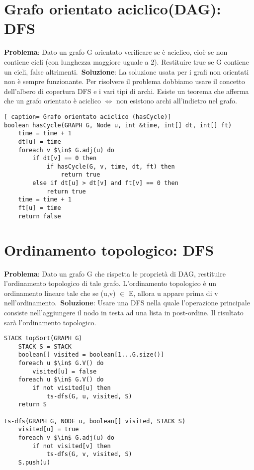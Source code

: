 \documentclass[../cheatSheetAlgoritmi.tex]{subfiles}
\begin{document}
\section{Grafo orientato aciclico(DAG): DFS}
\textbf{Problema}: Dato un grafo G orientato verificare se è aciclico, cioè se non contiene cicli (con lunghezza maggiore uguale a 2). Restituire true se G contiene un cicli, false altrimenti.\
\textbf{Soluzione}: La soluzione usata per i grafi non orientati non è sempre funzionante. Per risolvere il problema dobbiamo usare il concetto dell'albero di copertura DFS e i vari tipi di archi. Esiste un teorema che afferma che un grafo orientato è aciclico $\iff$ non esistono archi all'indietro nel grafo.
 

\begin{lstlisting}[ caption= Grafo orientato aciclico (hasCycle)]
boolean hasCycle(GRAPH G, Node u, int &time, int[] dt, int[] ft)
	time = time + 1
	dt[u] = time
	foreach v $\in$ G.adj(u) do
		if dt[v] == 0 then
			if hasCycle(G, v, time, dt, ft) then
				return true
		else if dt[u] > dt[v] and ft[v] == 0 then
			return true
	time = time + 1
	ft[u] = time
	return false
\end{lstlisting}


\section{Ordinamento topologico: DFS}
\textbf{Problema}: Dato un grafo G che rispetta le proprietà di DAG, restituire l'ordinamento topologico di tale grafo. L'ordinamento topologico è un ordinamento lineare tale che se (u,v) $\in$ E, allora u appare prima di v nell'ordinamento.\
\textbf{Soluzione}: Usare una DFS nella quale l'operazione principale consiste nell'aggiungere il nodo in testa ad una lista in post-ordine. Il risultato sarà l'ordinamento topologico. 
\begin{lstlisting}[caption= Ordinamento topologico]
STACK topSort(GRAPH G)
	STACK S = STACK
	boolean[] visited = boolean[1...G.size()]
	foreach u $\in$ G.V() do 
		visited[u] = false
	foreach u $\in$ G.V() do
		if not visited[u] then
			ts-dfs(G, u, visited, S)
	return S
	
ts-dfs(GRAPH G, NODE u, boolean[] visited, STACK S)
	visited[u] = true
	foreach v $\in$ G.adj(u) do
		if not visited[v] then
			ts-dfs(G, v, visited, S)
	S.push(u)
\end{lstlisting}
\end{document}
